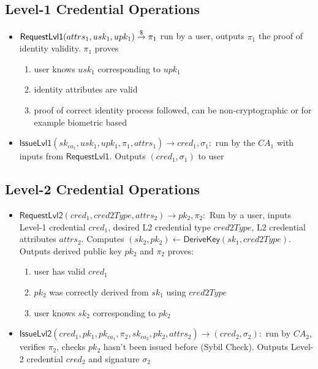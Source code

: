 \subsection{Level-1 Credential Operations}
\begin{itemize}
    \item $\mathsf{RequestLvl1}(attrs_1, usk_1, upk_1) \stackrel{\$}{\to} \pi_{1}$ run by a user, outputs $\pi_{1}$ the proof of identity validity. $\pi_1$ proves 
    \begin{enumerate}
        \item user knows $usk_1$ corresponding to $upk_1$
        \item identity attributes are valid
        \item proof of correct identity process followed, can be non-cryptographic or for example biometric based
    \end{enumerate}

    \item $\mathsf{IssueLvl1}(sk_{ca_1}, usk_1, upk_1, \pi_{1}, attrs_1) \to cred_1, \sigma_1:$ run by the $CA_1$ with inputs from $\mathsf{RequestLvl1}$. Outputs $(cred_1, \sigma_1)$ to user
\end{itemize}


\subsection{Level-2 Credential Operations}
\begin{itemize}
    \item $\mathsf{RequestLvl2}(cred_1, cred2Type, attrs_2) \to pk_2, \pi_{2}:$ Run by a user, inputs Level-1 credential $cred_1$, desired L2 credential type $cred2Type$, L2 credential attributes $attrs_2$. Computes $(sk_2, pk_2) \gets \mathsf{DeriveKey}(sk_1, cred2Type)$. Outputs derived public key $pk_2$ and $\pi_2$ proves:
    \begin{enumerate}
        \item user has valid $cred_1$
        \item $pk_2$ was correctly derived from $sk_1$ using $cred2Type$
        \item user knows $sk_2$ corresponding to $pk_2$
    \end{enumerate}

    \item $\mathsf{IssueLvl2}(cred_1, pk_1, pk_{ca_1}, \pi_2, sk_{ca_2}, pk_2, attrs_2) \to (cred_2, \sigma_2): $ run by $CA_2$, verifies $\pi_2$, checks $pk_2$ hasn't been issued before (Sybil Check). Outputs Level-2 credential $cred_2$ and signature $\sigma_2$
\end{itemize}



